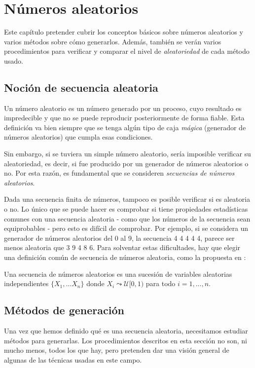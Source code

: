 \chapter{Números aleatorios}

Este capítulo pretender cubrir los conceptos básicos sobre números aleatorios y varios métodos sobre cómo generarlos.  Además, también se verán varios procedimientos para verificar y comparar el nivel de \textit{aleatoriedad} de cada método usado.

\section{Noción de secuencia aleatoria}

Un número aleatorio es un número generado por un proceso, cuyo resultado es impredecible y que no se puede reproducir posteriormente de forma fiable. Esta definición va bien siempre que se tenga algún tipo de caja \textit{mágica} (generador de números aleatorios) que cumpla esas condiciones.

Sin embargo, si se tuviera un simple número aleatorio, sería imposible verificar su aleatoriedad, es decir, si fue producido por un generador de números aleatorios o no. Por esta razón, es fundamental que se consideren \textit{secuencias de números aleatorios}.

Dada una secuencia finita de números, tampoco es posible verificar si es aleatoria o no. Lo único que se puede hacer es comprobar si tiene propiedades estadísticas comunes con una secuencia aleatoria - como que los números de la secuencia sean equiprobables - pero esto es difícil de comprobar. Por ejemplo, si se considera un generador de números aleatorios del 0 al 9, la secuencia 4 4 4 4 4, parece ser menos aleatoria que 3 9 4 8 6. Para solventar estas dificultades, hay que elegir una definición común de secuencia de números aleatoria, como la propuesta en \cite{SalmeronMorales}:

\begin{definition}
Una secuencia de números aleatorios es una sucesión de variables aleatorias independientes $\{X_1,\ldots X_n\}$ donde $X_i\leadsto\mathcal{U}[0,1)$ para todo $i=1,\ldots,n$.
\end{definition}

\section{Métodos de generación}

Una vez que hemos definido qué es una secuencia aleatoria, necesitamos estudiar métodos para generarlas. Los procedimientos descritos en esta sección no son, ni mucho menos, todos los que hay, pero pretenden dar una visión general de algunas de las técnicas usadas en este campo.

